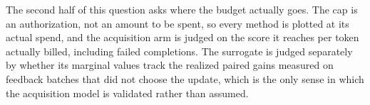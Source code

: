 The second half of this question asks where the budget actually goes.
The cap is an authorization, not an amount to be spent, so every
method is plotted at its actual spend, and the acquisition arm is
judged on the score it reaches per token actually billed, including
failed completions.  The surrogate is judged separately by whether its
marginal values track the realized paired gains measured on feedback
batches that did not choose the update, which is the only sense in
which the acquisition model is validated rather than assumed.
